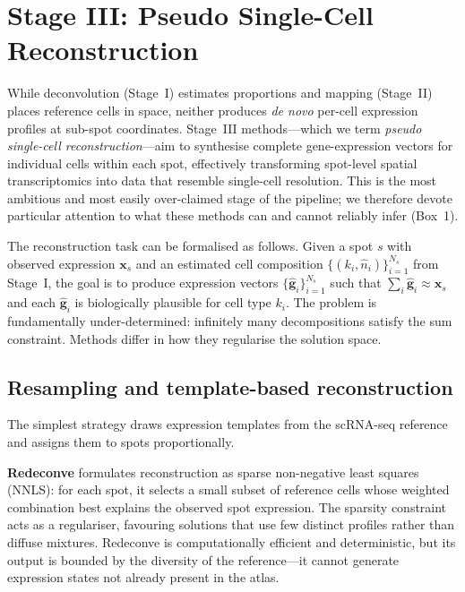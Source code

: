 \section{Stage III: Pseudo Single-Cell Reconstruction}
\label{sec:stage3}

While deconvolution (Stage~I) estimates proportions and mapping (Stage~II) places reference cells in space, neither produces \emph{de novo} per-cell expression profiles at sub-spot coordinates. Stage~III methods---which we term \emph{pseudo single-cell reconstruction}---aim to synthesise complete gene-expression vectors for individual cells within each spot, effectively transforming spot-level spatial transcriptomics into data that resemble single-cell resolution. This is the most ambitious and most easily over-claimed stage of the pipeline; we therefore devote particular attention to what these methods can and cannot reliably infer (Box~1).

The reconstruction task can be formalised as follows. Given a spot $s$ with observed expression $\mathbf{x}_s$ and an estimated cell composition $\{(k_i, \hat{n}_i)\}_{i=1}^{N_s}$ from Stage~I, the goal is to produce expression vectors $\{\hat{\mathbf{g}}_i\}_{i=1}^{N_s}$ such that $\sum_i \hat{\mathbf{g}}_i \approx \mathbf{x}_s$ and each $\hat{\mathbf{g}}_i$ is biologically plausible for cell type $k_i$. The problem is fundamentally under-determined: infinitely many decompositions satisfy the sum constraint. Methods differ in how they regularise the solution space.

\subsection{Resampling and template-based reconstruction}

The simplest strategy draws expression templates from the scRNA-seq reference and assigns them to spots proportionally.

\textbf{Redeconve} \citep{zhang2024redeconve} formulates reconstruction as sparse non-negative least squares (NNLS): for each spot, it selects a small subset of reference cells whose weighted combination best explains the observed spot expression. The sparsity constraint acts as a regulariser, favouring solutions that use few distinct profiles rather than diffuse mixtures. Redeconve is computationally efficient and deterministic, but its output is bounded by the diversity of the reference---it cannot generate expression states not already present in the atlas.

